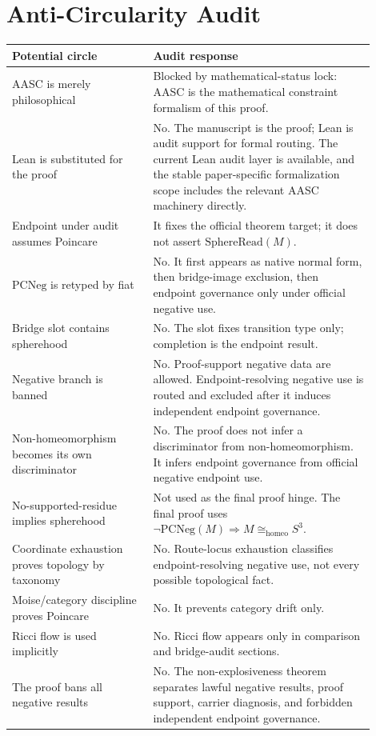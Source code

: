 \documentclass[11pt]{article}
\newcommand{\Sthree}{S^{3}}
\newcommand{\SphereRead}{\mathrm{SphereRead}}
\newcommand{\PCNeg}{\mathrm{PCNeg}}
\newcommand{\Homeo}{\cong_{\mathrm{homeo}}}
\begin{document}
\section{Anti-Circularity Audit}
\begin{longtable}{L{0.35\linewidth}L{0.55\linewidth}}
\toprule
\textbf{Potential circle} & \textbf{Audit response}\\
\midrule
AASC is merely philosophical & Blocked by mathematical-status lock: AASC is the mathematical constraint formalism of this proof.\\
Lean is substituted for the proof & No. The manuscript is the proof; Lean is audit support for formal routing. The current Lean audit layer is available, and the stable paper-specific formalization scope includes the relevant AASC machinery directly.\\
Endpoint under audit assumes Poincare & It fixes the official theorem target; it does not assert \(\SphereRead(M)\).\\
\(\PCNeg\) is retyped by fiat & No. It first appears as native normal form, then bridge-image exclusion, then endpoint governance only under official negative use.\\
Bridge slot contains spherehood & No. The slot fixes transition type only; completion is the endpoint result.\\
Negative branch is banned & No. Proof-support negative data are allowed. Endpoint-resolving negative use is routed and excluded after it induces independent endpoint governance.\\
Non-homeomorphism becomes its own discriminator & No. The proof does not infer a discriminator from non-homeomorphism. It infers endpoint governance from official negative endpoint use.\\
No-supported-residue implies spherehood & Not used as the final proof hinge. The final proof uses \(\neg\PCNeg(M)\Rightarrow M\Homeo\Sthree\).\\
Coordinate exhaustion proves topology by taxonomy & No. Route-locus exhaustion classifies endpoint-resolving negative use, not every possible topological fact.\\
Moise/category discipline proves Poincare & No. It prevents category drift only.\\
Ricci flow is used implicitly & No. Ricci flow appears only in comparison and bridge-audit sections.\\
The proof bans all negative results & No. The non-explosiveness theorem separates lawful negative results, proof support, carrier diagnosis, and forbidden independent endpoint governance.\\

\end{longtable}
\end{document}
